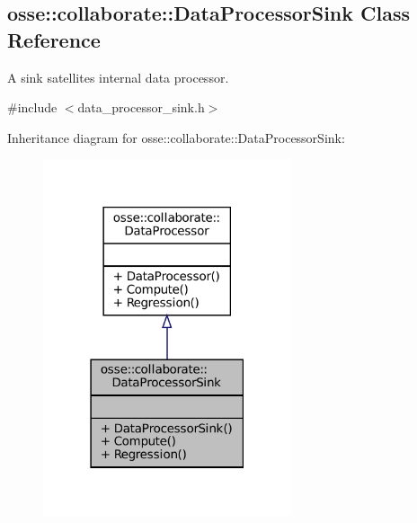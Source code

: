 \hypertarget{classosse_1_1collaborate_1_1_data_processor_sink}{}\subsection{osse\+:\+:collaborate\+:\+:Data\+Processor\+Sink Class Reference}
\label{classosse_1_1collaborate_1_1_data_processor_sink}


A sink satellite\textquotesingle{}s internal data processor.  




{\ttfamily \#include $<$data\+\_\+processor\+\_\+sink.\+h$>$}



Inheritance diagram for osse\+:\+:collaborate\+:\+:Data\+Processor\+Sink\+:
\nopagebreak
\begin{figure}[H]
\begin{center}
\leavevmode
\includegraphics[width=207pt]{classosse_1_1collaborate_1_1_data_processor_sink__inherit__graph}
\end{center}
\end{figure}

